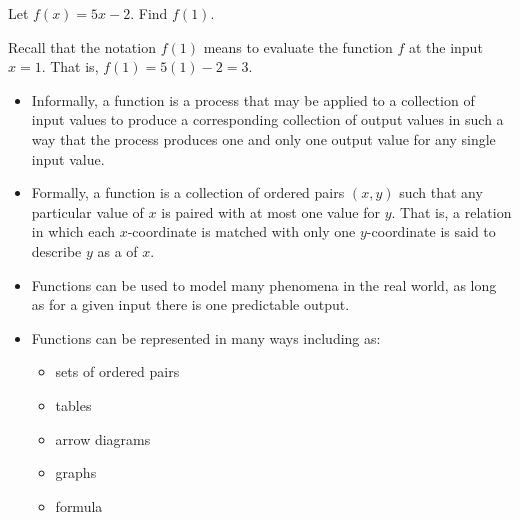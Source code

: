 \documentclass{ximera}
\begin{document}
\begin{example}
Let $f(x)=5x-2$.  Find $f(1)$.

\begin{explanation}
Recall that the notation $f(1)$ means to evaluate the function $f$ at the input $x=1$.  That is, $f(1)=5(1)-2=3$.
\end{explanation}
\end{example}

\begin{summary}\begin{itemize}
\item Informally, a function is a process that may be applied to a collection of input values to produce a corresponding collection of output values in such a way that the process produces one and only one output value for any single input value.
\item Formally, a function  is a collection of ordered pairs $(x,y)$ such that any particular value of $x$ is paired with at most one value for $y$. That is, a relation in which each $x$-coordinate is matched with only one $y$-coordinate is said to describe $y$ as a  of $x$.
\item Functions can be used to model many phenomena in the real world, as long as for a given input there is one predictable output.
\item Functions can be represented in many ways including as:
\begin{itemize}
\item sets of ordered pairs
\item tables
\item arrow diagrams
\item graphs
\item formula
\end{itemize}
\end{itemize}\end{summary}
\end{document}

